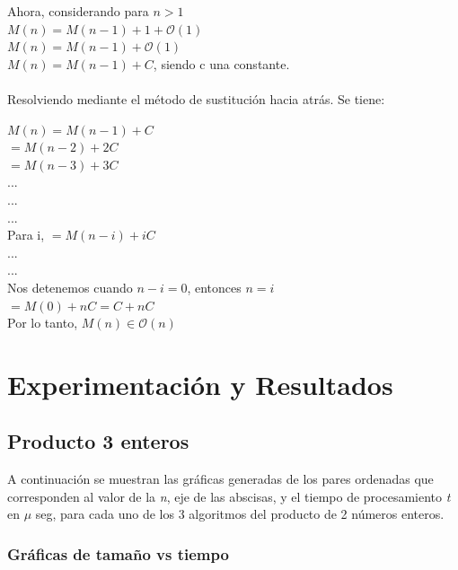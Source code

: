 \documentclass{report}
\begin{document}
\begin{itemize}
                Ahora, considerando para $n>1$\\
                    $M(n)=M(n-1)+1+\mathcal{O}(1)$\\
                    $M(n)=M(n-1)+\mathcal{O}(1)$\\
                    $M(n)=M(n-1)+C$, siendo c una constante.\\\\
                Resolviendo mediante el m\'etodo de sustituci\'on hacia atr\'as. Se tiene:
                \begin{multicols}{2}{}
                    $M(n)=M(n-1)+C$\\
                    $=M(n-2)+2C$\\
                    $=M(n-3)+3C$\\
                    ...\\
                    ...\\
                    ...\\
                    Para i, $=M(n-i)+iC$\\
                    ...\\
                    ...\\
                    Nos detenemos cuando $n-i=0$, entonces
                    $n=i$\\
                    $=M(0)+nC = C+nC$\\
                    Por lo tanto, $M(n)\in\mathcal{O}(n)$\\
                \end{multicols}
            \end{itemize}

\newpage

\section*{Experimentación y Resultados}
    \subsection*{Producto 3 enteros}
        A continuación se muestran las gráficas generadas de los pares ordenadas que corresponden al valor de la \textit{n}, eje de las abscisas, y el tiempo de procesamiento \textit{t} en $\mu$ seg, para cada uno de los 3 algoritmos del producto de 2 números enteros.\\
        \subsubsection*{Gráficas de tamaño vs tiempo}
                
\end{document}
